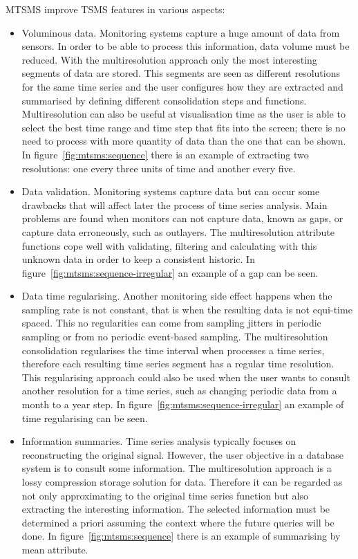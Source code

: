 MTSMS improve TSMS features in various aspects:
\begin{itemize}

\item Voluminous data. Monitoring systems capture a huge amount of
  data from sensors. In order to be able to process this information,
  data volume must be reduced. With the multiresolution approach only
  the most interesting segments of data are stored. This segments are
  seen as different resolutions for the same time series and the user
  configures how they are extracted and summarised by defining
  different consolidation steps and functions. Multiresolution can
  also be useful at visualisation time as the user is able to select
  the best time range and time step that fits into the screen; there
  is no need to process with more quantity of data than the one that
  can be shown. In figure~\ref{fig:mtsms:sequence} there is an example of
  extracting two resolutions: one every three units of time and
  another every five.

\item Data validation. Monitoring systems capture data but can occur
  some drawbacks that will affect later the process of time series
  analysis. Main problems are found when monitors can not capture
  data, known as gaps, or capture data erroneously, such as outlayers.
  The multiresolution attribute functions cope well with validating,
  filtering and calculating with this unknown data in order to keep a
  consistent historic. In figure~\ref{fig:mtsms:sequence-irregular} an
  example of a gap can be seen.

\item Data time regularising. Another monitoring side effect happens
  when the sampling rate is not constant, that is when the resulting
  data is not equi-time spaced. This no regularities can come from
  sampling jitters in periodic sampling or from no periodic
  event-based sampling. The multiresolution consolidation regularises
  the time interval when processes a time series, therefore each
  resulting time series segment has a regular time resolution. This
  regularising approach could also be used when the user wants to
  consult another resolution for a time series, such as changing
  periodic data from a month to a year step. In
  figure~\ref{fig:mtsms:sequence-irregular} an example of time
  regularising can be seen.

\item Information summaries. Time series analysis typically focuses on
  reconstructing the original signal. However, the user objective in a
  database system is to consult some information. The multiresolution
  approach is a lossy compression storage solution for data. Therefore
  it can be regarded as not only approximating to the original time
  series function but also extracting the interesting information. The
  selected information must be determined a priori assuming the
  context where the future queries will be done. In
  figure~\ref{fig:mtsms:sequence} there is an example of summarising by
  mean attribute.

\end{itemize}





